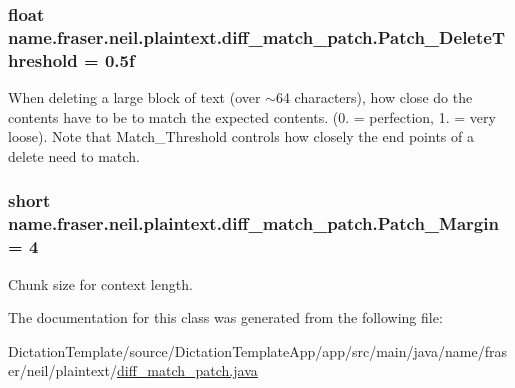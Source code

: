 \subsubsection[{\texorpdfstring{Patch\+\_\+\+Delete\+Threshold}{Patch_DeleteThreshold}}]{\setlength{\rightskip}{0pt plus 5cm}float name.\+fraser.\+neil.\+plaintext.\+diff\+\_\+match\+\_\+patch.\+Patch\+\_\+\+Delete\+Threshold = 0.\+5f}\hypertarget{classname_1_1fraser_1_1neil_1_1plaintext_1_1diff__match__patch_ab48a2853a1d72f4217c4ebd388645a69}{}\label{classname_1_1fraser_1_1neil_1_1plaintext_1_1diff__match__patch_ab48a2853a1d72f4217c4ebd388645a69}
When deleting a large block of text (over $\sim$64 characters), how close do the contents have to be to match the expected contents. (0. = perfection, 1. = very loose). Note that Match\+\_\+\+Threshold controls how closely the end points of a delete need to match. 
\subsubsection[{\texorpdfstring{Patch\+\_\+\+Margin}{Patch_Margin}}]{\setlength{\rightskip}{0pt plus 5cm}short name.\+fraser.\+neil.\+plaintext.\+diff\+\_\+match\+\_\+patch.\+Patch\+\_\+\+Margin = 4}\hypertarget{classname_1_1fraser_1_1neil_1_1plaintext_1_1diff__match__patch_a5cba475f64055824f3242cde0605de1a}{}\label{classname_1_1fraser_1_1neil_1_1plaintext_1_1diff__match__patch_a5cba475f64055824f3242cde0605de1a}
Chunk size for context length. 

The documentation for this class was generated from the following file\+:\begin{DoxyCompactItemize}
\item 
Dictation\+Template/source/\+Dictation\+Template\+App/app/src/main/java/name/fraser/neil/plaintext/\hyperlink{diff__match__patch_8java}{diff\+\_\+match\+\_\+patch.\+java}\end{DoxyCompactItemize}
